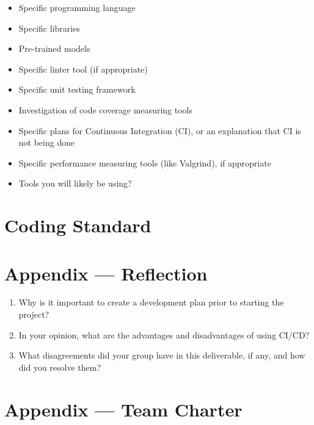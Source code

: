 \documentclass{article}
\begin{document}
\begin{itemize}
\item Specific programming language
\item Specific libraries
\item Pre-trained models
\item Specific linter tool (if appropriate)
\item Specific unit testing framework
\item Investigation of code coverage measuring tools
\item Specific plans for Continuous Integration (CI), or an explanation that CI
  is not being done
\item Specific performance measuring tools (like Valgrind), if
  appropriate
\item Tools you will likely be using?
\end{itemize}


\section{Coding Standard}


\newpage{}

\section*{Appendix --- Reflection}




\begin{enumerate}
    \item Why is it important to create a development plan prior to starting the
    project?
    \item In your opinion, what are the advantages and disadvantages of using
    CI/CD?
    \item What disagreements did your group have in this deliverable, if any,
    and how did you resolve them?
\end{enumerate}

\newpage{}

\section*{Appendix --- Team Charter}
\end{document}
